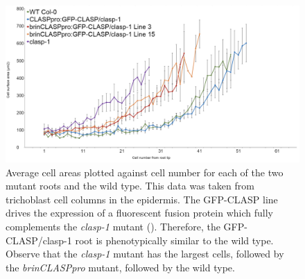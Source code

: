 \medskip

\begin{figure}[!htbp]
    \centering
    \includegraphics[width=13cm]{img/mutant-cell-sizes.png}
    \caption{Average cell areas plotted against cell number for each of the two mutant roots and the wild type. This data was taken from trichoblast cell columns in the epidermis. The GFP-CLASP line drives the expression of a fluorescent fusion protein which fully complements the \emph{clasp-1} mutant (\cite{ambrose2011}). Therefore, the GFP-CLASP/clasp-1 root is phenotypically similar to the wild type. Observe that the \emph{clasp-1} mutant has the largest cells, followed by the \emph{brinCLASPpro} mutant, followed by the wild type.}
    \label{fig:mutant-sizes}
\end{figure}







